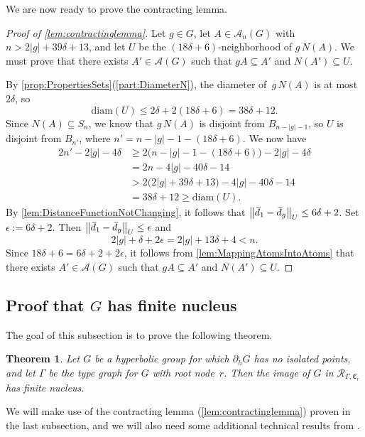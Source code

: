 \documentclass[11pt,letterpaper]{amsart}
\newtheorem{theorem}{Theorem}[section]
\theoremstyle{definition}
\newcommand{\R}{\mathcal{R}}
\newcommand{\C}{\mathfrak{C}}
\newcommand{\A}{\mathcal{A}}
\newcommand{\od}{\mkern 3mu\overline{\mkern-3mu d\mkern 1.5mu}\mkern-1.5mu}
\begin{document}
We are now ready to prove the contracting lemma.

\begin{proof}[Proof of \cref{lem:contractinglemma}]
Let $g\in G$, let $A\in \A_n(G)$ with $n >  2|g|+39\delta+13$, and let $U$ be the $(18\delta+6)$-neighborhood of $g\,N(A)$.  We must prove that there exists $A'\in \A(G)$ such that $gA\subseteq A'$ and $N(A')\subseteq U$.

By \cref{prop:PropertiesSets}(\ref{part:DiameterN}), the diameter of~$g\,N(A)$ is at most $2\delta$, so 
\[
\mathrm{diam}(U)\leq  2\delta + 2(18\delta+6) = 38\delta+12.
 \]
Since $N(A)\subseteq S_n$, we know that $g\,N(A)$ is disjoint from $B_{n-|g|-1}$, so $U$ is disjoint from $B_{n'}$, where $n'=n-|g|-1-(18\delta+6)$. We now have
\begin{align*}
2n'-2|g|-4\delta &\geq 2\bigl(n-|g|-1-(18\delta+6)\bigr) -2|g| -4\delta \\
&= 2n-4|g| - 40\delta - 14
\\
&> 2\bigl(2|g|+39\delta+13\bigr) -4|g| - 40\delta - 14 \\
& =38\delta+12 \geq \mathrm{diam}(U).
\end{align*}
By \cref{lem:DistanceFunctionNotChanging}, it follows that $\bigl\|\od_{1}-\od_{g}\bigr\|_U\leq 6\delta+2$.  Set $\epsilon:=6\delta+2$.  Then $\bigl\|\od_{1}-\od_{g}\bigr\|_U\leq \epsilon$ and
\[
2|g|+\delta + 2\epsilon = 2|g|+13\delta +4 < n.
\]
Since $18\delta+6=6\delta+2+2\epsilon$, it follows from \cref{lem:MappingAtomsIntoAtoms} that there exists $A'\in \A(G)$ such that $gA\subseteq A'$ and $N(A')\subseteq U$.
\end{proof}


\subsection{Proof that \texorpdfstring{$G$}{\textit{G}} has finite nucleus}\label{ssec:contracting}

The goal of this subsection is to prove the following theorem.

\begin{theorem}\label{thrm:contracting}
Let $G$ be a hyperbolic group for which $\partial_h G$ has no isolated points, and let\/ $\Gamma$ be the type graph for $G$ with root node~$r$.  Then the image of $G$ in $\R_{\Gamma,\C_r}$ has finite nucleus.
\end{theorem}

We will make use of the contracting lemma (\cref{lem:contractinglemma}) proven in the last subsection, and we will also need some additional technical results from \cite{BelkBleakMatucci}.
\end{document}
